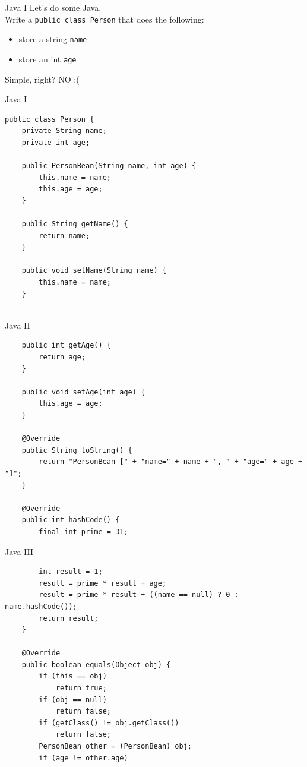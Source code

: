 \documentclass[10pt]{beamer}
\begin{document}
	\begin{frame}[fragile]{Java I}
		Let's do some Java.\\
		Write a \texttt{public class Person} that does the following:
		\begin{itemize}
			\item store a string \texttt{name}
			\item store an int \texttt{age}
		\end{itemize}
		Simple, right?
		\vfill\pause
		NO :(
\end{frame}
	
	
	\begin{frame}[fragile]{Java I}
		\begin{verbatim}
public class Person {
	private String name;
	private int age;
	
	public PersonBean(String name, int age) {
		this.name = name;
		this.age = age;
	}
	
	public String getName() {
		return name;
	}
	
	public void setName(String name) {
		this.name = name;
	}
	
		\end{verbatim}
\end{frame}
	\begin{frame}[fragile]{Java II}
		\begin{verbatim}
	public int getAge() {
		return age;
	}
	
	public void setAge(int age) {
		this.age = age;
	}
	
	@Override
	public String toString() {
		return "PersonBean [" + "name=" + name + ", " +	"age=" + age + "]";
	}
	
	@Override
	public int hashCode() {
		final int prime = 31;
		\end{verbatim}
\end{frame}
	\begin{frame}[fragile]{Java III}
		\begin{verbatim}
		int result = 1;
		result = prime * result + age;
		result = prime * result + ((name == null) ? 0 : name.hashCode());
		return result;
	}
	
	@Override
	public boolean equals(Object obj) {
		if (this == obj)
			return true;
		if (obj == null)
			return false;
		if (getClass() != obj.getClass())
			return false;
		PersonBean other = (PersonBean) obj;
		if (age != other.age)
		\end{verbatim}
\end{frame}
\end{document}
